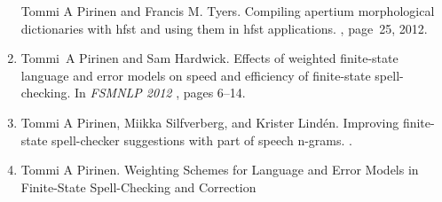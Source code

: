 \documentclass[officiallayout]{unihelcompling}
\begin{document}
\begin{enumerate}
        Tommi A Pirinen and Francis M. Tyers.
        \newblock Compiling apertium morphological dictionaries with hfst and
        using them in hfst applications.
        , page~25, 2012.
    \item[\citetalias{pirinen2012effects}]
        Tommi~A Pirinen and Sam Hardwick.
        \newblock Effects of weighted finite-state language and error models on
        speed and efficiency of finite-state spell-checking.
        \newblock In {\em FSMNLP 2012\/} \citep{fsmnlp2012}, pages 6--14.
    \item[\citetalias{pirinen2012improving}]
        Tommi A Pirinen, Miikka Silfverberg, and Krister Lindén.
        \newblock Improving finite-state spell-checker suggestions with part of
        speech n-grams.
        .
    \item[\citetalias{pirinen2013quality}]
        Tommi A Pirinen.
        \newblock Weighting Schemes for Language and Error Models in
        Finite-State Spell-Checking and Correction
\end{enumerate}
\end{document}

